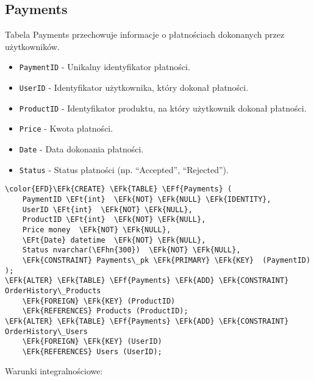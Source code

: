 \documentclass[11pt]{article}
\newcommand{\EFk}[1]{\textcolor{EFk}{\textbf{#1}}} %
\newcommand{\EFf}[1]{\textcolor{EFf}{#1}} %
\newcommand{\EFt}[1]{\textcolor{EFt}{\textbf{#1}}} %
\newcommand{\EFhn}[1]{\textcolor{EFhn}{#1}} %
\begin{document}
\subsection{Payments}
\label{sec:orgbbf8972}
Tabela Payments przechowuje informacje o płatnościach dokonanych przez użytkowników.
\begin{itemize}
\item \texttt{PaymentID} - Unikalny identyfikator płatności.
\item \texttt{UserID} - Identyfikator użytkownika, który dokonał płatności.
\item \texttt{ProductID} - Identyfikator produktu, na który użytkownik dokonał płatności.
\item \texttt{Price} - Kwota płatności.
\item \texttt{Date} - Data dokonania płatności.
\item \texttt{Status} - Status płatności (np. ``Accepted'', ``Rejected'').
\end{itemize}
\begin{Code}
\begin{Verbatim}
\color{EFD}\EFk{CREATE} \EFk{TABLE} \EFf{Payments} (
    PaymentID \EFt{int}  \EFk{NOT} \EFk{NULL} \EFk{IDENTITY},
    UserID \EFt{int}  \EFk{NOT} \EFk{NULL},
    ProductID \EFt{int}  \EFk{NOT} \EFk{NULL},
    Price money  \EFk{NOT} \EFk{NULL},
    \EFt{Date} datetime  \EFk{NOT} \EFk{NULL},
    Status nvarchar(\EFhn{300})  \EFk{NOT} \EFk{NULL},
    \EFk{CONSTRAINT} Payments\_pk \EFk{PRIMARY} \EFk{KEY}  (PaymentID)
);
\EFk{ALTER} \EFk{TABLE} \EFf{Payments} \EFk{ADD} \EFk{CONSTRAINT} OrderHistory\_Products
    \EFk{FOREIGN} \EFk{KEY} (ProductID)
    \EFk{REFERENCES} Products (ProductID);
\EFk{ALTER} \EFk{TABLE} \EFf{Payments} \EFk{ADD} \EFk{CONSTRAINT} OrderHistory\_Users
    \EFk{FOREIGN} \EFk{KEY} (UserID)
    \EFk{REFERENCES} Users (UserID);
\end{Verbatim}
\end{Code}
Warunki integralnościowe:
\end{document}

